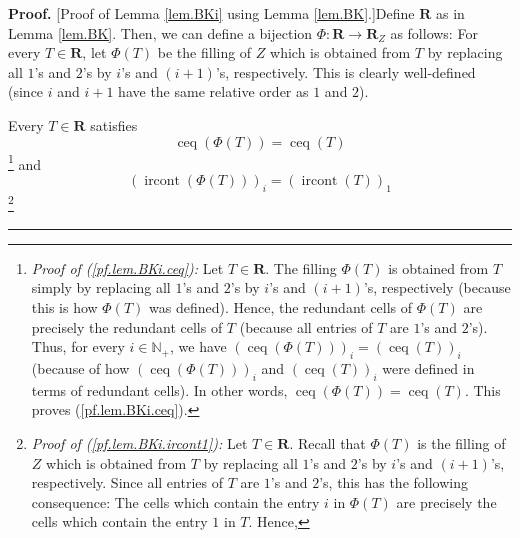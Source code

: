 \documentclass[numbers=enddot,12pt,final,onecolumn,notitlepage]{scrartcl}%
\theoremstyle{definition}
\newenvironment{proof}[1][Proof]{\noindent\textbf{#1.} }{\ \rule{0.5em}{0.5em}}
\newenvironment{verlong}{}{}
\begin{document}
\begin{verlong}
\begin{proof}
[Proof of Lemma \ref{lem.BKi} using Lemma \ref{lem.BK}.]Define $\mathbf{R}$ as
in Lemma \ref{lem.BK}. Then, we can define a bijection $\Phi:\mathbf{R}%
\rightarrow\mathbf{R}_{Z}$ as follows: For every $T\in\mathbf{R}$, let
$\Phi\left(  T\right)  $ be the filling of $Z$ which is obtained from $T$ by
replacing all $1$'s and $2$'s by $i$'s and $\left(  i+1\right)  $'s,
respectively. This is clearly well-defined (since $i$ and $i+1$ have the same
relative order as $1$ and $2$).

Every $T\in\mathbf{R}$ satisfies%
\begin{equation}
\operatorname*{ceq}\left(  \Phi\left(  T\right)  \right)  =\operatorname*{ceq}%
\left(  T\right)  \label{pf.lem.BKi.ceq}%
\end{equation}
\footnote{\textit{Proof of (\ref{pf.lem.BKi.ceq}):} Let $T\in\mathbf{R}$. The
filling $\Phi\left(  T\right)  $ is obtained from $T$ simply by replacing all
$1$'s and $2$'s by $i$'s and $\left(  i+1\right)  $'s, respectively (because
this is how $\Phi\left(  T\right)  $ was defined). Hence, the redundant cells
of $\Phi\left(  T\right)  $ are precisely the redundant cells of $T$ (because
all entries of $T$ are $1$'s and $2$'s). Thus, for every $i\in\mathbb{N}_{+}$,
we have $\left(  \operatorname*{ceq}\left(  \Phi\left(  T\right)  \right)
\right)  _{i}=\left(  \operatorname*{ceq}\left(  T\right)  \right)  _{i}$
(because of how $\left(  \operatorname*{ceq}\left(  \Phi\left(  T\right)
\right)  \right)  _{i}$ and $\left(  \operatorname*{ceq}\left(  T\right)
\right)  _{i}$ were defined in terms of redundant cells). In other words,
$\operatorname*{ceq}\left(  \Phi\left(  T\right)  \right)
=\operatorname*{ceq}\left(  T\right)  $. This proves (\ref{pf.lem.BKi.ceq}).}
and%
\begin{equation}
\left(  \operatorname*{ircont}\left(  \Phi\left(  T\right)  \right)  \right)
_{i}=\left(  \operatorname*{ircont}\left(  T\right)  \right)  _{1}
\label{pf.lem.BKi.ircont1}%
\end{equation}
\footnote{\textit{Proof of (\ref{pf.lem.BKi.ircont1}):} Let $T\in\mathbf{R}$.
Recall that $\Phi\left(  T\right)  $ is the filling of $Z$ which is obtained
from $T$ by replacing all $1$'s and $2$'s by $i$'s and $\left(  i+1\right)
$'s, respectively. Since all entries of $T$ are $1$'s and $2$'s, this has the
following consequence: The cells which contain the entry $i$ in $\Phi\left(
T\right)  $ are precisely the cells which contain the entry $1$ in $T$. Hence,%
}
\end{proof}
\end{verlong}
\end{document}

